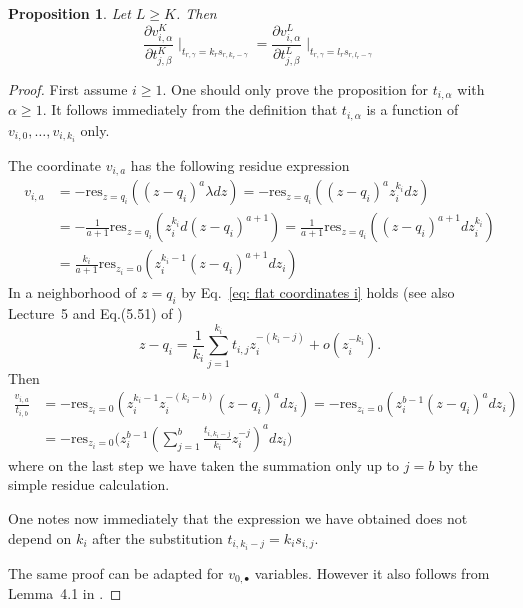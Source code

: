 \documentclass[12pt,a4paper]{amsart}
\def\res{{\mathrm{res}}}
\newcommand{\p}{{\partial}}
\newcommand{\<}{\left<}
\renewcommand{\>}{\right>}
\newtheorem{proposition}[theorem]{Proposition}
\numberwithin{equation}{section}
\begin{document}
\begin{proposition}\label{prop: psi stabilization}
    Let $L \ge K$. Then
    \[
        \frac{\p v_{i,\alpha}^K}{\p t_{j,\beta}^K} \mid_{t_{r,\gamma} = k_r s_{r,k_r-\gamma}}
         =
         \frac{\p v_{i,\alpha}^L}{\p t_{j,\beta}^L} \mid_{t_{r,\gamma} = l_r s_{r, l_r-\gamma}}
    \]
\end{proposition}
\begin{proof}    
    First assume $i \ge 1$. 
    One should only prove the proposition for $t_{i,\alpha}$ with $\alpha \ge 1$. 
    It follows immediately from the definition that $t_{i,\alpha}$ is a function of $v_{i,0},\dots,v_{i,k_i}$ only. 
    
    The coordinate $v_{i,a}$ has the following residue expression
    \begin{align*}
        v_{i,a} & = - \res_{z = q_i} ((z-q_i)^a \lambda dz) = - \res_{z = q_i} ((z-q_i)^a z_i^{k_i} dz)
        \\
        &= - \frac{1}{a+1} \res_{z = q_i} (z_i^{k_i} d (z-q_i)^{a+1}) 
        = \frac{1}{a+1} \res_{z = q_i} ((z-q_i)^{a+1} d z_i^{k_i} )
        \\
        & = \frac{k_i}{a+1} \res_{z_i = 0} (z_i^{k_i-1} (z-q_i)^{a+1} d z_i )
    \end{align*}
    In a neighborhood of $z = q_i$ by Eq.~\eqref{eq: flat coordinates i} holds (see also Lecture~5 and Eq.(5.51) of \cite{D2})
    \begin{equation}\label{eq: local variable expansion}
        z -q_i = \frac{1}{k_i} \sum_{j=1}^{k_i} t_{i,j} z_i^{-(k_i-j)} + o(z_i^{-k_i}).
    \end{equation}
    Then 
    \begin{align*}
        \frac{v_{i,a}}{t_{i,b}} &= - \res_{z_i = 0} (z_i^{k_i-1} z_i^{-(k_i-b)} (z-q_i)^{a} d z_i ) = - \res_{z_i = 0} (z_i^{b-1} (z-q_i)^{a} d z_i )
        \\
        &= - \res_{z_i = 0} \Big( z_i^{b-1} (\sum_{j=1}^{b} \frac{t_{i,k_i-j}}{k_i}  z_i^{-j} )^{a} d z_i \Big)
    \end{align*}
    where on the last step we have taken the summation only up to $j=b$ by the simple residue calculation.
    
    One notes now immediately that the expression we have obtained does not depend on $k_i$ after the substitution $t_{i,k_i-j} = k_i s_{i,j}$.

    The same proof can be adapted for $v_{0,\bullet}$ variables. However it also follows from Lemma~4.1 in \cite{BDbN}. 
\end{proof}
\end{document}
